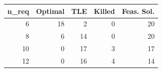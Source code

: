 
\begin{tabular}{rrrrr}
\toprule
n\_req & Optimal & TLE & Killed & Feas. Sol.\\
\midrule
6 & 18 & 2 & 0 & 20\\
8 & 6 & 14 & 0 & 20\\
10 & 0 & 17 & 3 & 17\\
12 & 0 & 16 & 4 & 14\\
\bottomrule
\end{tabular}

